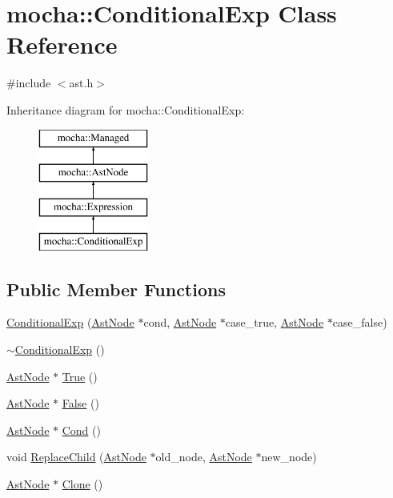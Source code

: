 \hypertarget{classmocha_1_1_conditional_exp}{
\section{mocha::ConditionalExp Class Reference}
\label{classmocha_1_1_conditional_exp}
}


{\ttfamily \#include $<$ast.h$>$}

Inheritance diagram for mocha::ConditionalExp:\begin{figure}[H]
\begin{center}
\leavevmode
\includegraphics[height=4.000000cm]{classmocha_1_1_conditional_exp}
\end{center}
\end{figure}
\subsection*{Public Member Functions}
\begin{DoxyCompactItemize}
\item 
\hyperlink{classmocha_1_1_conditional_exp_af14ae917b07a37d05d08b9adff48d44c}{ConditionalExp} (\hyperlink{classmocha_1_1_ast_node}{AstNode} $\ast$cond, \hyperlink{classmocha_1_1_ast_node}{AstNode} $\ast$case\_\-true, \hyperlink{classmocha_1_1_ast_node}{AstNode} $\ast$case\_\-false)
\item 
\hyperlink{classmocha_1_1_conditional_exp_abace5fb783efded7b0eac17f88cd3602}{$\sim$ConditionalExp} ()
\item 
\hyperlink{classmocha_1_1_ast_node}{AstNode} $\ast$ \hyperlink{classmocha_1_1_conditional_exp_aaed0b73fb13035c1ca5465f2a24a833b}{True} ()
\item 
\hyperlink{classmocha_1_1_ast_node}{AstNode} $\ast$ \hyperlink{classmocha_1_1_conditional_exp_aff17d7cdbc31e6725fd9fe1c89e9a896}{False} ()
\item 
\hyperlink{classmocha_1_1_ast_node}{AstNode} $\ast$ \hyperlink{classmocha_1_1_conditional_exp_aa19a0246f74af43f5f485173476803af}{Cond} ()
\item 
void \hyperlink{classmocha_1_1_conditional_exp_afc1d1c6448489deac42837c5d89d836e}{ReplaceChild} (\hyperlink{classmocha_1_1_ast_node}{AstNode} $\ast$old\_\-node, \hyperlink{classmocha_1_1_ast_node}{AstNode} $\ast$new\_\-node)
\item 
\hyperlink{classmocha_1_1_ast_node}{AstNode} $\ast$ \hyperlink{classmocha_1_1_conditional_exp_a568bfc0b7fce3e0155e3c789baf6fa40}{Clone} ()
\end{DoxyCompactItemize}
